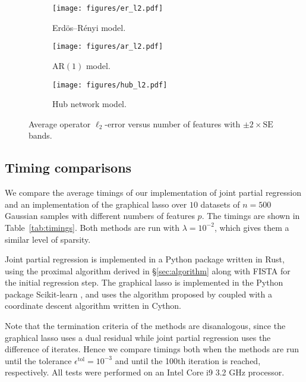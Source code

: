 \documentclass{article}
\begin{document}
\begin{figure}[ht]
    \centering
    \begin{subfigure}[t]{0.3\linewidth}
        \centering
        \texttt{[image: figures/er\_l2.pdf]}
        \caption{Erdös--Rényi model.}
        \label{fig:er_l2}
    \end{subfigure}
    \begin{subfigure}[t]{0.3\linewidth}
        \centering
        \texttt{[image: figures/ar\_l2.pdf]}
        \caption{$\text{AR}(1)$ model.}
        \label{fig:ar_l2}
    \end{subfigure}
    \begin{subfigure}[t]{0.3\linewidth}
        \centering
        \texttt{[image: figures/hub\_l2.pdf]}
        \caption{Hub network model.}
        \label{fig:hub_l2}
    \end{subfigure}
    \caption{Average operator $\ell_2$-error versus number of features with $\pm 2
    \times \text{SE}$ bands.}
    \label{fig:l2-error}
\end{figure}

\subsection{Timing comparisons}\label{ssec:timings} We compare the average
timings of our implementation of joint partial regression and an implementation
of the graphical lasso over $10$ datasets of $n=500$ Gaussian samples with
different numbers of features $p$. The timings are shown in
Table~\ref{tab:timings}. Both methods are run with $\lambda=10^{-2}$, which
gives them a similar level of sparsity. 

Joint partial regression is implemented in a Python package written in Rust,
using the proximal algorithm derived in \S\ref{sec:algorithm} along with FISTA
\citep{Beck09} for the initial regression step. The graphical lasso is
implemented in the Python package Scikit-learn \citep{sklearn}, and uses the
algorithm proposed by \cite{Friedman08} coupled with a coordinate descent
algorithm written in Cython. 

Note that the termination criteria of the methods are disanalogous, since the
graphical lasso uses a dual residual while joint partial regression uses the
difference of iterates. Hence we compare timings both when the methods are run
until the tolerance $\epsilon^\text{tol} = 10^{-3}$ and until the 100th
iteration is reached, respectively. All tests were performed on an Intel Core
i9 3.2 GHz processor.
\end{document}
